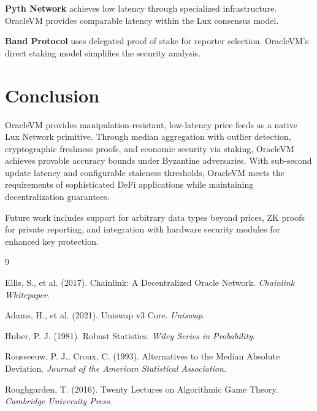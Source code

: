 \documentclass[11pt,a4paper]{article}
\theoremstyle{definition}
\begin{document}
\textbf{Pyth Network} achieves low latency through specialized infrastructure. OracleVM provides comparable latency within the Lux consensus model.

\textbf{Band Protocol} uses delegated proof of stake for reporter selection. OracleVM's direct staking model simplifies the security analysis.

\section{Conclusion}

OracleVM provides manipulation-resistant, low-latency price feeds as a native Lux Network primitive. Through median aggregation with outlier detection, cryptographic freshness proofs, and economic security via staking, OracleVM achieves provable accuracy bounds under Byzantine adversaries. With sub-second update latency and configurable staleness thresholds, OracleVM meets the requirements of sophisticated DeFi applications while maintaining decentralization guarantees.

Future work includes support for arbitrary data types beyond prices, ZK proofs for private reporting, and integration with hardware security modules for enhanced key protection.


\begin{thebibliography}{9}

Ellis, S., et al. (2017). Chainlink: A Decentralized Oracle Network. \textit{Chainlink Whitepaper}.

Adams, H., et al. (2021). Uniswap v3 Core. \textit{Uniswap}.

Huber, P. J. (1981). Robust Statistics. \textit{Wiley Series in Probability}.

Rousseeuw, P. J., Croux, C. (1993). Alternatives to the Median Absolute Deviation. \textit{Journal of the American Statistical Association}.

Roughgarden, T. (2016). Twenty Lectures on Algorithmic Game Theory. \textit{Cambridge University Press}.

\end{thebibliography}
\end{document}
